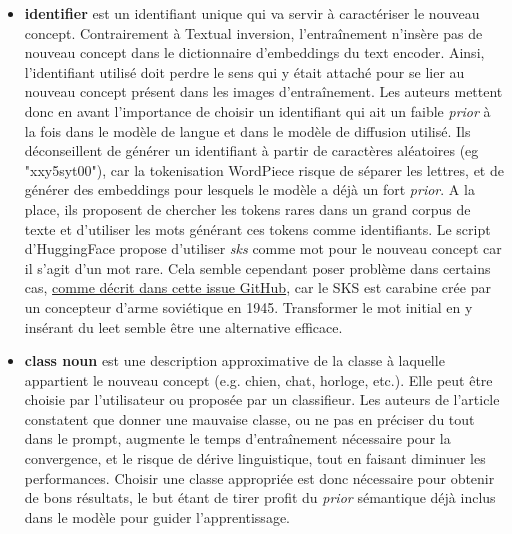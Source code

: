 \documentclass{article}
\begin{document}
\begin{itemize}
    \item \textbf{identifier} est un identifiant unique qui va servir à caractériser le nouveau concept. Contrairement à Textual inversion, l'entraînement n'insère pas de nouveau concept dans le dictionnaire d'embeddings du text encoder. Ainsi, l'identifiant utilisé doit perdre le sens qui y était attaché pour se lier au nouveau concept présent dans les images d'entraînement. Les auteurs mettent donc en avant l'importance de choisir un identifiant qui ait un faible \textit{prior} à la fois dans le modèle de langue et dans le modèle de diffusion utilisé. Ils déconseillent de générer un identifiant à partir de caractères aléatoires (eg "xxy5syt00"), car la tokenisation WordPiece \cite{WordPiece} risque de séparer les lettres, et de générer des embeddings pour lesquels le modèle a déjà un fort \textit{prior}. A la place, ils proposent de chercher les tokens rares dans un grand corpus de texte et d'utiliser les mots générant ces tokens comme identifiants. Le script d'HuggingFace propose d'utiliser \textit{sks} comme mot pour le nouveau concept car il s'agit d'un mot rare. Cela semble cependant poser problème dans certains cas, \href{https://github.com/XavierXiao/Dreambooth-Stable-Diffusion/issues/71}{comme décrit dans cette issue GitHub}, car le SKS est carabine crée par un concepteur d'arme soviétique en 1945. Transformer le mot initial en y insérant du leet semble être une alternative efficace.
    \item \textbf{class noun} est une description approximative de la classe à laquelle appartient le nouveau concept (e.g. chien, chat, horloge, etc.). Elle peut être choisie par l'utilisateur ou proposée par un classifieur. Les auteurs de l'article constatent que donner une mauvaise classe, ou ne pas en préciser du tout dans le prompt, augmente le temps d'entraînement nécessaire pour la convergence, et le risque de dérive linguistique, tout en faisant diminuer les performances. Choisir une classe appropriée est donc nécessaire pour obtenir de bons résultats, le but étant de tirer profit du \textit{prior} sémantique déjà inclus dans le modèle pour guider l'apprentissage.
\end{itemize}
\end{document}
